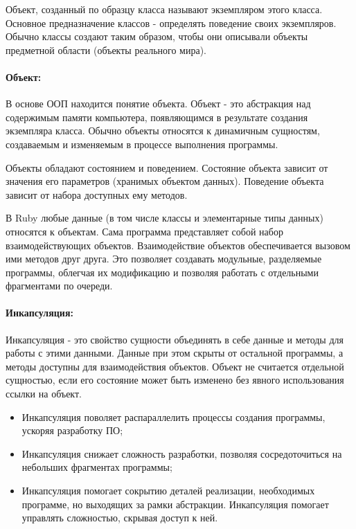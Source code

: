 Объект, созданный по образцу класса называют экземпляром этого класса. Основное предназначение классов - определять поведение своих экземпляров. Обычно классы создают таким образом, чтобы они описывали объекты предметной области (объекты реального мира).

\paragraph*{Объект:}

В основе ООП находится понятие объекта. Объект - это абстракция над содержимым памяти компьютера, появляющимся в результате создания экземпляра класса. Обычно объекты относятся к динамичным сущностям, создаваемым и изменяемым в процессе выполнения программы.

Объекты обладают состоянием и поведением. Состояние объекта зависит от значения его параметров (хранимых объектом данных). Поведение объекта зависит от набора доступных ему методов.

В Ruby любые данные (в том числе классы и элементарные типы данных) относятся к объектам. Сама программа представляет собой набор взаимодействующих объектов. Взаимодействие объектов обеспечивается вызовом ими методов друг друга. Это позволяет создавать модульные, разделяемые программы, облегчая их модификацию и позволяя работать с отдельными фрагментами по очереди.

\paragraph*{Инкапсуляция:}

Инкапсуляция - это свойство сущности объединять в себе данные и методы для работы с этими данными. Данные при этом скрыты от остальной программы, а методы доступны для взаимодействия объектов. Объект не считается отдельной сущностью, если его состояние может быть изменено без явного использования ссылки на объект.
\begin{itemize}
  \item Инкапсуляция поволяет распараллелить процессы создания программы, ускоряя разработку ПО;

  \item Инкапсуляция снижает сложность разработки, позволяя сосредоточиться на небольших фрагментах программы;

  \item Инкапсуляция помогает сокрытию деталей реализации, необходимых программе, но выходящих за рамки абстракции. Инкапсуляция помогает управлять сложностью, скрывая доступ к ней.
\end{itemize}

